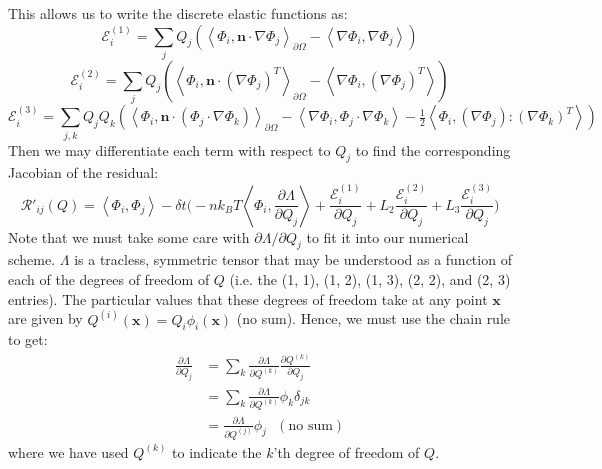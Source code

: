 \documentclass[reqno]{article}
\begin{document}
This allows us to write the discrete elastic functions as:
\begin{equation}
    \mathcal{E}^{(1)}_i
    = \sum_j Q_j \left( 
        \left< \Phi_i, \mathbf{n} \cdot \nabla \Phi_j \right>_{\partial \Omega}
        - \left< \nabla \Phi_i, \nabla \Phi_j \right>
    \right)
\end{equation}
\begin{equation}
    \mathcal{E}^{(2)}_i
    =
    \sum_j Q_j 
    \left(
    \left< \Phi_i, \mathbf{n} \cdot \left( \nabla \Phi_j \right)^T \right>_{\partial \Omega}
    - \left< \nabla \Phi_i, \left( \nabla \Phi_j \right)^T \right>
    \right)
\end{equation}
\begin{equation}
    \mathcal{E}^{(3)}_i
    =
    \sum_{j, k} Q_j Q_k 
    \left(
        \left< \Phi_i, \mathbf{n} \cdot \left( \Phi_j \cdot \nabla \Phi_k \right) \right>_{\partial \Omega}
        - \left< \nabla \Phi_i, \Phi_j \cdot \nabla \Phi_k \right> 
        - \tfrac12 \left< \Phi_i, \left( \nabla \Phi_j \right) : \left( \nabla \Phi_k \right)^T \right>
    \right)
\end{equation}
Then we may differentiate each term with respect to $Q_j$ to find the corresponding Jacobian of the residual:
\begin{equation}
    \mathcal{R}'_{ij}(Q)
    =
    \left<\Phi_i, \Phi_j\right>
    -
    \delta t \biggl(
        - n k_B T \left<\Phi_i, \frac{\partial \Lambda}{\partial Q_j} \right>
        + \frac{\mathcal{E}^{(1)}_i}{\partial Q_j}
        + L_2 \frac{\mathcal{E}^{(2)}_i}{\partial Q_j}
        + L_3 \frac{\mathcal{E}^{(3)}_i}{\partial Q_j}
    \biggr)
\end{equation}
Note that we must take some care with $\partial \Lambda / \partial Q_j$ to fit it into our numerical scheme.
$\Lambda$ is a tracless, symmetric tensor that may be understood as a function of each of the degrees of freedom of $Q$ (i.e. the (1, 1), (1, 2), (1, 3), (2, 2), and (2, 3) entries).
The particular values that these degrees of freedom take at any point $\mathbf{x}$ are given by $Q^{(i)} (\mathbf{x}) = Q_i \phi_i (\mathbf{x})$ (no sum).
Hence, we must use the chain rule to get:
\begin{equation}
    \begin{split}
        \frac{\partial \Lambda}{\partial Q_j}
        &= \sum_k \frac{\partial \Lambda}{\partial Q^{(k)}} \frac{\partial Q^{(k)}}{\partial Q_j} \\
        &= \sum_k \frac{\partial \Lambda}{\partial Q^{(k)}} \phi_k \delta_{jk} \\
        &= \frac{\partial \Lambda}{\partial Q^{(j)}} \phi_j \:\:\: (\text{no sum})
    \end{split}
\end{equation}
where we have used $Q^{(k)}$ to indicate the $k$'th degree of freedom of $Q$.
\end{document}
